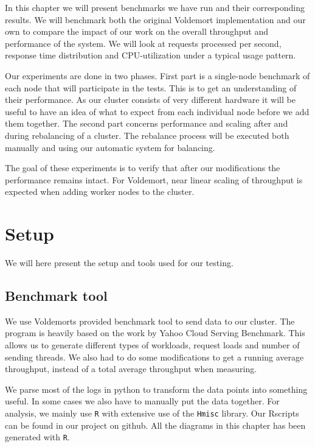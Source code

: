 

In this chapter we will present benchmarks we have run and their corresponding results. We will benchmark both the original Voldemort implementation and our own to compare the impact of our work on the overall throughput and performance of the system. We will look at requests processed per second, response time distribution and CPU-utilization under a typical usage pattern. 

Our experiments are done in two phases. First part is a single-node benchmark of each node that will participate in the tests. This is to get an understanding of their performance. As our cluster consists of very different hardware it will be useful to have an idea of what to expect from each individual node before we add them together.
The second part concerns performance and scaling after and during rebalancing of a cluster. The rebalance process will be executed both manually and using our automatic system for balancing.

The goal of these experiments is to verify that after our modifications the performance remains intact. For Voldemort, near linear scaling of throughput is expected when adding worker nodes to the cluster. 

\section{Setup}
We will here present the setup and tools used for our testing.

\subsection{Benchmark tool}
We use Voldemorts provided benchmark tool to send data to our cluster. The program is heavily based on the work by Yahoo Cloud Serving Benchmark\cite{ycsb}. This allows us to generate different types of workloads, request loads and number of sending threads. We also had to do some modifications to get a running average throughput, instead of a total average throughput when measuring.

We parse most of the logs in python to transform the data points into something useful. In some cases we also have to manually put the data together.
For analysis, we mainly use \texttt{R}\cite{Rproject} with extensive use of the \texttt{Hmisc}\cite{Hmisc} library. Our Rscripts can be found in our project on github\cite{githubproject}. All the diagrams in this chapter has been generated with \texttt{R}.

